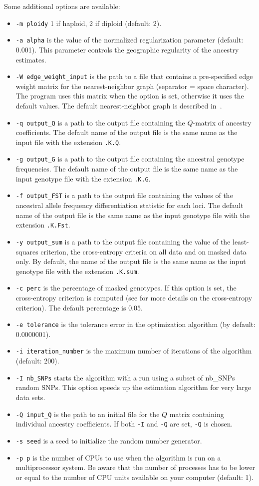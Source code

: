 \documentclass[12pt,a4paper]{article}
\begin{document}
\noindent
Some additional options are available:
\begin{itemize}
\item \verb|-m ploidy|  1 if haploid, 2 if diploid (default: 2). 
\item \verb|-a alpha| is the value of the normalized regularization parameter 
(default: 0.001). This parameter controls the geographic regularity of the ancestry 
estimates.
\item \verb|-W edge_weight_input| is the path to a file that contains a 
pre-specified edge weight matrix for the nearest-neighbor graph (separator = 
space character). The program uses this matrix when the option is set, otherwise 
it uses the default values. The default nearest-neighbor graph is described in~\cite{
TESS3}.
\item \verb|-q output_Q| is a path to the output file containing the $Q$-matrix 
of ancestry coefficients. The default name of the output file is the same name 
as the input file with the extension {\tt .K.Q}.
\item \verb|-g output_G| is a path to the output file containing the ancestral 
genotype frequencies. The default name of the output file is the same name as 
the input genotype file with the extension {\tt .K.G}.
\item \verb|-f output_FST| is a path to the output file containing the values of 
the ancestral allele frequency differentiation statistic for each loci. The 
default name of the output file is the same name as the input genotype file with 
the extension {\tt .K.Fst}.
\item \verb|-y output_sum| is a path to the output file containing the value of 
the least-squares criterion, the cross-entropy criteria on all data and on 
masked data only. By default, the name of the output file is the same name as 
the input genotype file with the extension {\tt .K.sum}.
\item \verb|-c perc| is the percentage of masked genotypes. If this option is 
set, the cross-entropy criterion is computed (see\cite{frichot2014fast} for more 
details on the cross-entropy criterion). The default percentage is $0.05$.
\item \verb|-e tolerance| is the tolerance error in the optimization algorithm 
(by default: 0.0000001). 
\item \verb|-i iteration_number| is the maximum number of iterations of the 
algorithm (default: 200). 
\item \verb|-I nb_SNPs| starts the algorithm with a run using a subset of 
nb\_SNPs random SNPs. This option speeds up the estimation algorithm for very 
large data sets.
\item \verb|-Q input_Q| is the path to an initial file for the $Q$ matrix 
containing individual ancestry coefficients. If both \verb|-I| and \verb|-Q| are 
set, \verb|-Q| is chosen.
\item \verb|-s seed| is a seed to initialize the random number generator. 
\item \verb|-p p| is the number of CPUs to use when the algorithm is run on a 
multiprocessor system.
Be aware that the number of processes has to be lower or equal to the number of 
CPU units available on your computer (default: 1).


\end{itemize}
\end{document}
